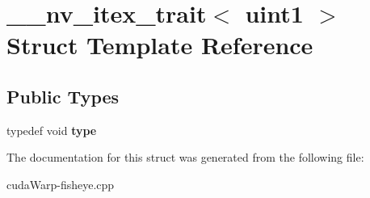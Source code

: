 \hypertarget{struct____nv__itex__trait_3_01uint1_01_4}{}\section{\+\_\+\+\_\+nv\+\_\+itex\+\_\+trait$<$ uint1 $>$ Struct Template Reference}
\label{struct____nv__itex__trait_3_01uint1_01_4}
\subsection*{Public Types}
\begin{DoxyCompactItemize}
\item 
typedef void {\bfseries type}\hypertarget{struct____nv__itex__trait_3_01uint1_01_4_a4f9a275c3fa73ae9f968e4c0d8ba45ac}{}\label{struct____nv__itex__trait_3_01uint1_01_4_a4f9a275c3fa73ae9f968e4c0d8ba45ac}

\end{DoxyCompactItemize}


The documentation for this struct was generated from the following file\+:\begin{DoxyCompactItemize}
\item 
cuda\+Warp-\/fisheye.\+cpp\end{DoxyCompactItemize}
